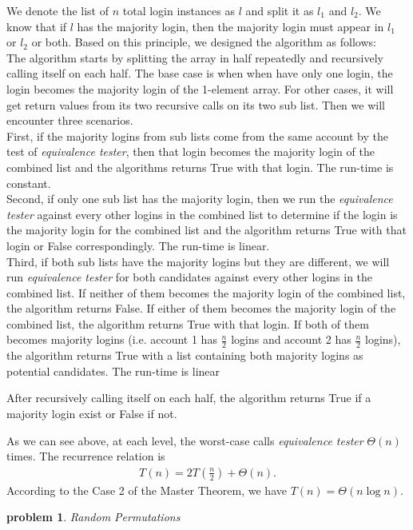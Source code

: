 \documentclass[10pt]{article}
\newtheorem{problem}{\sc\color{cit}problem}
\begin{document}
We denote the list of $n$ total login instances as $l$ and split it as $l_1$ and $l_2$. We know that if $l$ has the majority login, then the majority login must appear in $l_1$ or $l_2$ or both. Based on this principle, we designed the algorithm as follows:
\\
The algorithm starts by splitting the array in half repeatedly and recursively calling itself on each half. The base case is when when have only one login, the login becomes the majority login of the 1-element array. For other cases, it will get return values from its two recursive calls on its two sub list. Then we will encounter three scenarios. 
\\First, if the majority logins from sub lists come from the same account by the test of \emph{equivalence tester}, then that login becomes the majority login of the combined list and the algorithms returns True with that login. The run-time is constant.
\\Second, if only one sub list has the majority login, then we run the \emph{equivalence tester} against every other logins in the combined list to determine if the login is the majority login for the combined list and the algorithm returns True with that login or False correspondingly. The run-time is linear.
\\Third, if both sub lists have the majority logins but they are different, we will run \emph{equivalence tester} for both candidates against every other logins in the combined list. If neither of them becomes the majority login of the combined list, the algorithm returns False. If either of them becomes the majority login of the combined list, the algorithm returns True with that login. If both of them becomes majority logins (i.e. account 1 has $\frac{n}{2}$ logins and account 2 has $\frac{n}{2}$ logins), the algorithm returns True with a list containing both majority logins as potential candidates. The run-time is linear

After recursively calling itself on each half, the algorithm returns True if a majority login exist or False if not.

As we can see above, at each level, the worst-case calls \emph{equivalence tester} $\Theta(n)$ times. The recurrence relation is 
\begin{align}
    T(n) = 2 T(\frac{n}{2}) + \Theta(n).
\end{align}
According to the Case 2 of the Master Theorem, we have $T(n) = \Theta(n \log n)$.
\vspace*{.25in} %
\begin{problem} Random Permutations \end{problem}
\end{document}
